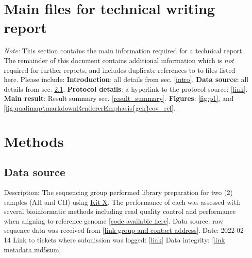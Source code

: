 \section{Main files for technical writing report} \textit{Note:} This section contains the main information required for a technical report. The remainder of this document contains additional information which is \textit{not} required for further reports, and includes duplicate references to to files listed here. Please include:\markdownRendererInterblockSeparator
{}\markdownRendererUlBeginTight
\markdownRendererUlItem \textbf{Introduction}: all details from sec. \ref{intro}.\markdownRendererUlItemEnd 
\markdownRendererUlItem \textbf{Data source}: all details from sec. \ref{data_source}.\markdownRendererUlItemEnd 
\markdownRendererUlItem \textbf{Protocol details}: a hyperlink to the protocol source: [\href{https://github.com/DylanLawless/kit_assess/README.md}{link}].\markdownRendererUlItemEnd 
\markdownRendererUlItem \textbf{Main result}: Result summary sec. \ref{result_summary}.\markdownRendererUlItemEnd 
\markdownRendererUlItem \textbf{Figures}: \ref{fig:p1}, and \ref{fig:qualimap\markdownRendererEmphasis{gen}cov_ref}.\markdownRendererUlItemEnd 
\markdownRendererUlEndTight \markdownRendererInterblockSeparator
{}\section{Methods} \subsection{Data source} \label{data_source}\markdownRendererInterblockSeparator
{}\markdownRendererUlBeginTight
\markdownRendererUlItem Description: The sequencing group performed library preparation for two (2) samples (AH and CH) using \href{https://www.sophiagenetics.com/clinical/oncology/solid-tumors/}{Kit X}. The performance of each was assessed with several bioinformatic methods including read quality control and performance when aligning to reference genome [\href{https://github.com/DylanLawless/kit_assess}{code available here}].\markdownRendererUlItemEnd 
\markdownRendererUlItem Data source: raw sequence data was received from [\href{https://www.sophiagenetics.com}{link group and contact address}].\markdownRendererUlItemEnd 
\markdownRendererUlItem Date: 2022-02-14\markdownRendererUlItemEnd 
\markdownRendererUlItem Link to tickets where submission was logged: [\href{https://www.sophiagenetics.com}{link}]\markdownRendererUlItemEnd 
\markdownRendererUlItem Data integrity: [\href{https://github.com/DylanLawless/kit_assess/src/metadata/raw.md5sum}{link metadata md5sum}].\markdownRendererUlItemEnd 
